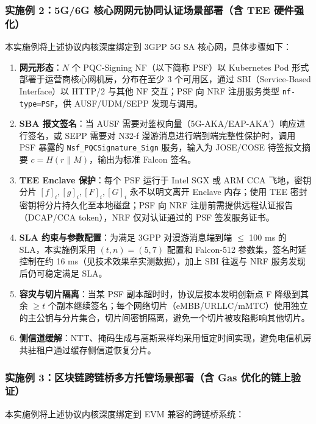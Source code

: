 \documentclass[12pt,a4paper]{article}
\begin{document}
\subsubsection{实施例 2：5G/6G 核心网网元协同认证场景部署（含 TEE 硬件强化）}

本实施例将上述协议内核深度绑定到 3GPP 5G SA 核心网，具体步骤如下：

\begin{enumerate}
    \item \textbf{网元形态}：$N$ 个 PQC-Signing NF（以下简称 PSF）以 Kubernetes Pod 形式部署于运营商核心网机房，分布在至少 3 个可用区，通过 SBI（Service-Based Interface）以 HTTP/2 与其他 NF 交互；PSF 向 NRF 注册服务类型 \texttt{nf-type=PSF}，供 AUSF/UDM/SEPP 发现与调用。
    \item \textbf{SBA 报文签名}：当 AUSF 需要对鉴权向量（5G-AKA/EAP-AKA'）响应进行签名，或 SEPP 需要对 N32-f 漫游消息进行端到端完整性保护时，调用 PSF 暴露的 \texttt{Nsf\_PQCSignature\_Sign} 服务，输入为 JOSE/COSE 待签报文摘要 $c = H(r \| M)$，输出为标准 Falcon 签名。
    \item \textbf{TEE Enclave 保护}：每个 PSF 运行于 Intel SGX 或 ARM CCA 飞地，密钥分片 $[f]_i, [g]_i, [F]_i, [G]_i$ 永不以明文离开 Enclave 内存；使用 TEE 密封密钥将分片持久化至本地磁盘；PSF 向 NRF 注册前需提供远程认证报告（DCAP/CCA token），NRF 仅对认证通过的 PSF 签发服务证书。
    \item \textbf{SLA 约束与参数配置}：为满足 3GPP 对漫游消息端到端 $\le$ 100 ms 的 SLA，本实施例采用 $(t,n)=(5,7)$ 配置和 Falcon-512 参数集，签名时延控制在约 16 ms（见技术效果章实测数据），加上 SBI 往返与 NRF 服务发现后仍可稳定满足 SLA。
    \item \textbf{容灾与切片隔离}：当某 PSF 副本超时时，协议层按本发明创新点 F 降级到其余 $\ge t$ 个副本继续签名；每个网络切片（eMBB/URLLC/mMTC）使用独立的主公钥与分片集合，切片间密钥隔离，避免一个切片被攻陷影响其他切片。
    \item \textbf{侧信道缓解}：NTT、掩码生成与高斯采样均采用恒定时间实现，避免电信机房共驻租户通过缓存侧信道恢复分片。
\end{enumerate}

\subsubsection{实施例 3：区块链跨链桥多方托管场景部署（含 Gas 优化的链上验证）}

本实施例将上述协议内核深度绑定到 EVM 兼容的跨链桥系统：
\end{document}
